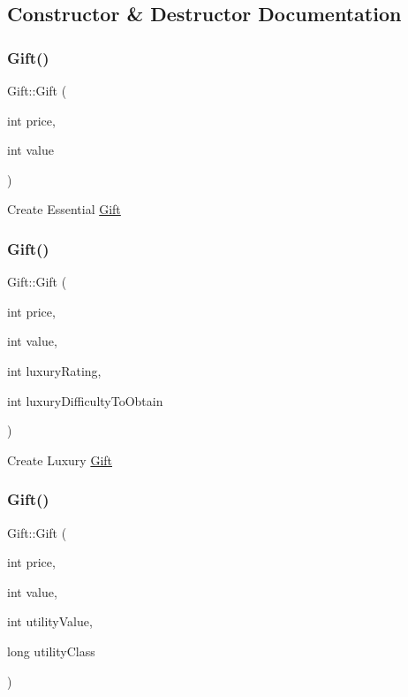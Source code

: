 \subsection{Constructor \& Destructor Documentation}
\mbox{\label{class_gift_a3518b10b5b491f98a56e0b7d27736783}} 
\subsubsection{\texorpdfstring{Gift()}{Gift()}\hspace{0.1cm}{\footnotesize\ttfamily [1/3]}}
{\footnotesize\ttfamily Gift\+::\+Gift (\begin{DoxyParamCaption}\item[{int}]{price,  }\item[{int}]{value }\end{DoxyParamCaption})}

Create Essential \hyperlink{class_gift}{Gift} \mbox{\label{class_gift_a95ed6819ae16875595be9a0100f060de}} 
\subsubsection{\texorpdfstring{Gift()}{Gift()}\hspace{0.1cm}{\footnotesize\ttfamily [2/3]}}
{\footnotesize\ttfamily Gift\+::\+Gift (\begin{DoxyParamCaption}\item[{int}]{price,  }\item[{int}]{value,  }\item[{int}]{luxury\+Rating,  }\item[{int}]{luxury\+Difficulty\+To\+Obtain }\end{DoxyParamCaption})}

Create Luxury \hyperlink{class_gift}{Gift} \mbox{\label{class_gift_a5f3dd07ba0552c716f3abc55d521e063}} 
\subsubsection{\texorpdfstring{Gift()}{Gift()}\hspace{0.1cm}{\footnotesize\ttfamily [3/3]}}
{\footnotesize\ttfamily Gift\+::\+Gift (\begin{DoxyParamCaption}\item[{int}]{price,  }\item[{int}]{value,  }\item[{int}]{utility\+Value,  }\item[{long}]{utility\+Class }\end{DoxyParamCaption})}

